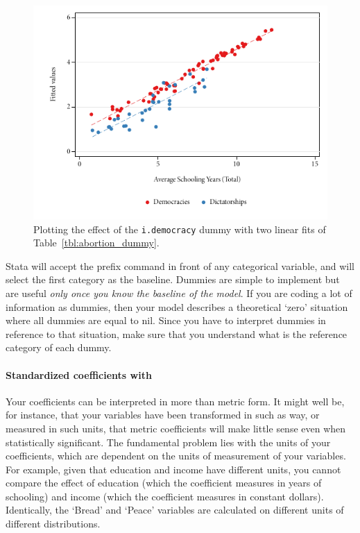 	\begin{figure}[htp]
		\includegraphics[width=.9\textwidth]{images/abortion_dummy_plot.pdf}

		\caption[Plotting the effect of a dummy]{\label{fig:abortion_dummy_plot}
		Plotting the effect of the \texttt{i.democracy} dummy with two linear fits of Table~\ref{tbl:abortion_dummy}.\\
		\qog}
	\end{figure}%

	Stata will accept the  prefix command in front of any categorical variable, and will select the first category as the baseline. Dummies are simple to implement but are useful \emph{only once you know the baseline of the model}. If you are coding a lot of information as dummies, then your model describes a theoretical `zero' situation where all dummies are equal to nil. Since you have to interpret dummies in reference to that situation, make sure that you understand what is the reference category of each dummy.

  
	\paragraph{Standardized coefficients with }%
	\label{sec:beta}%
	Your coefficients can be interpreted in more than metric form. It might well be, for instance, that your variables have been transformed in such as way, or measured in such units, that metric coefficients will make little sense even when statistically significant. The fundamental problem lies with the units of your coefficients, which are dependent on the units of measurement of your variables. For example, given that education and income have different units, you cannot compare the effect of education (which the coefficient measures in years of schooling) and income (which the coefficient measures in constant dollars). Identically, the `Bread' and `Peace' variables are calculated on different units of different distributions.
	
